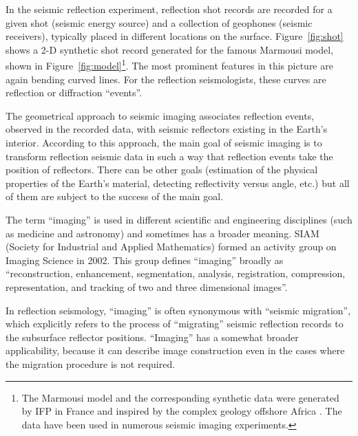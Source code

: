 \documentclass[12pt]{handout}
\begin{document}

In the seismic reflection experiment, reflection shot records are
recorded for a given shot (seismic energy source) and a collection of
geophones (seismic receivers), typically placed in different locations
on the surface.  Figure~\ref{fig:shot} shows a 2-D synthetic shot
record generated for the famous Marmousi model, shown in
Figure~\ref{fig:model}\footnote{The Marmousi model and the
corresponding synthetic data were generated by IFP in France and
inspired by the complex geology offshore Africa
\cite[]{TLE13-09-09270936}. The data have been used in numerous
seismic imaging experiments.}. The most prominent features in this
picture are again bending curved lines. For the reflection
seismologists, these curves are reflection or diffraction ``events''.

The geometrical approach to seismic imaging associates reflection events,
observed in the recorded data, with seismic reflectors existing in the Earth's
interior. According to this approach, the main goal of seismic imaging is to
transform reflection seismic data in such a way that reflection events take
the position of reflectors. There can be other goals (estimation of the
physical properties of the Earth's material, detecting reflectivity versus
angle, etc.) but all of them are subject to the success of the main goal. 




The term ``imaging'' is used in different scientific and engineering
disciplines (such as medicine and astronomy) and sometimes has a broader
meaning. SIAM (Society for Industrial and Applied Mathematics) formed an
activity group on Imaging Science in 2002. This group defines ``imaging''
broadly as ``reconstruction, enhancement, segmentation, analysis,
registration, compression, representation, and tracking of two and three
dimensional images''.

In reflection seismology, ``imaging'' is often synonymous with ``seismic
migration'', which explicitly refers to the process of ``migrating'' seismic
reflection records to the subsurface reflector positions. ``Imaging'' has a
somewhat broader applicability, because it can describe image construction
even in the cases where the migration procedure is not required.
\end{document}
